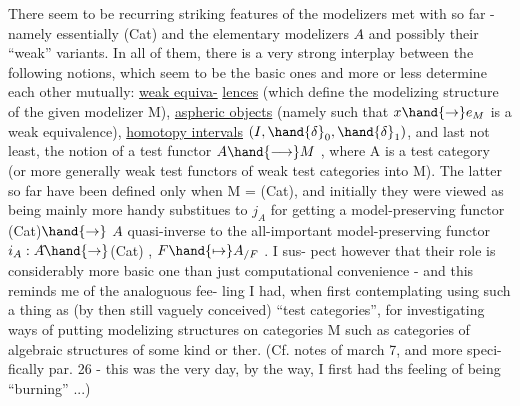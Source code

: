 There seem to be recurring striking features of the modelizers met
with so far  -  namely essentially (Cat) and the elementary modelizers $A\hat{}$
and possibly their ``weak'' variants.  In all of them,  there is a very
strong interplay between the following notions,  which seem to be the
basic ones and more or less determine each other mutually:  \uline{weak equiva-}%
\uline{lences} (which define the modelizing structure of the given modelizer M),
\uline{aspheric objects}  (namely such that  $x \hand{\to} e_M$ is a weak equivalence),
\uline{homotopy intervals}  $(I,\hand{\delta}_0,\hand{\delta}_1)$,  and last not least,  the notion of a test
functor  $A \hand{\longrightarrow} M$ ,  where A is a test category (or more generally weak
test functors of weak test categories into M).  The latter so far have
been defined only when M = (Cat),  and initially they were viewed 
as being mainly  more handy substitues to  $j_A$\hand{,} for getting a
model-preserving functor (Cat)$\hand{\to}$ $A\hat{}$ quasi-inverse to the all-important
 model-preserving functor   $i_A : A\hat{}\hand{\to}$(Cat) ,  $F \hand{\mapsto} A_{/F}$ .  I sus-%
pect however that their role is  considerably more basic one than just
computational convenience  -  and this reminds me of the analoguous fee-%
ling I had,  when first contemplating using such a thing as (by then still
vaguely conceived) ``test categories'',  for investigating ways of putting
modelizing structures on categories M such as categories of algebraic
structures of some kind or ther. (Cf. notes of march 7,  and more speci-%
fically par. 26  -  this was the very day,  by the way,  I first had ths
feeling of being ``burning'' ...)

